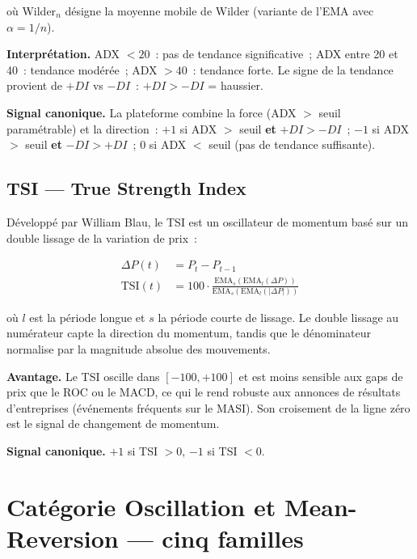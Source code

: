 où Wilder$_n$ désigne la moyenne mobile de Wilder (variante de l'EMA avec $\alpha = 1/n$).

\textbf{Interprétation.}
ADX $< 20$~: pas de tendance significative~; ADX entre 20 et 40~: tendance modérée~;
ADX $> 40$~: tendance forte. Le signe de la tendance provient de $+DI$ vs $-DI$~:
$+DI > -DI$ = haussier.

\textbf{Signal canonique.}
La plateforme combine la force (ADX $>$ seuil paramétrable) et la direction~:
$+1$ si ADX $>$ seuil \textbf{et} $+DI > -DI$~;
$-1$ si ADX $>$ seuil \textbf{et} $-DI > +DI$~;
$0$ si ADX $<$ seuil (pas de tendance suffisante).

\subsection{TSI — True Strength Index}

Développé par William Blau, le TSI est un oscillateur de momentum basé sur un double
lissage de la variation de prix~:

\begin{align}
    \Delta P(t)      &= P_t - P_{t-1} \label{eq:tsi_dp} \\
    \text{TSI}(t)    &= 100 \cdot \frac{\text{EMA}_{s}(\text{EMA}_{l}(\Delta P))}
                                        {\text{EMA}_{s}(\text{EMA}_{l}(|\Delta P|))}
    \label{eq:tsi}
\end{align}

où $l$ est la période longue et $s$ la période courte de lissage. Le double lissage
au numérateur capte la direction du momentum, tandis que le dénominateur normalise
par la magnitude absolue des mouvements.

\textbf{Avantage.}
Le TSI oscille dans $[-100, +100]$ et est moins sensible aux gaps de prix que le ROC
ou le MACD, ce qui le rend robuste aux annonces de résultats d'entreprises
(événements fréquents sur le MASI). Son croisement de la ligne zéro est le signal
de changement de momentum.

\textbf{Signal canonique.} $+1$ si TSI $> 0$, $-1$ si TSI $< 0$.

\section{Catégorie Oscillation et Mean-Reversion — cinq familles}
\label{sec:at_oscillation}

